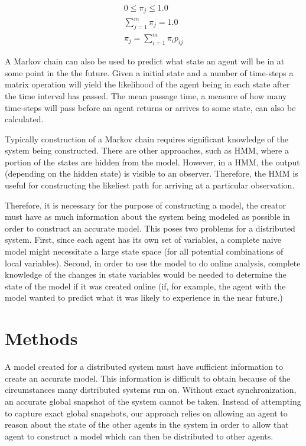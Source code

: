 \begin{align}
0\leq\pi_j\leq1.0 \\
\sum_{j = 1}^{m}\pi_j = 1.0 \\
\pi_j = \sum_{i=1}^{m} \pi_i p_{ij}
\end{align}

A Markov chain can also be used to predict what state an agent will be in at some point in the the future.
Given a initial state and a number of time-steps a matrix operation will yield the likelihood of the agent being in each state after the time interval has passed.
The mean passage time, a measure of how many time-steps will pass before an agent returns or arrives to some state, can also be calculated.

Typically construction of a Markov chain requires significant knowledge of the system being constructed. There are other approaches, such as \ac{HMM}, where a portion of the states are hidden from the model. However, in a \ac{HMM}, the output (depending on the hidden state) is visible to an observer. Therefore, the \ac{HMM} is useful for constructing the likeliest path for arriving at a particular observation.

Therefore, it is necessary for the purpose of constructing a model, the creator must have as much information about the system being modeled as possible in order to construct an accurate model. This poses two problems for a distributed system. First, since each agent has its own set of variables, a complete naive model might necessitate a large state space (for all potential combinations of local variables). Second, in order to use the model to do online analysis, complete knowledge of the changes in state variables would be needed to determine the state of the model if it was created online (if, for example, the agent with the model wanted to predict what it was likely to experience in the near future.)


\section{Methods}

A model created for a distributed system must have sufficient information to create an accurate model. This information is difficult to obtain because of the circumstances many distributed systems run on. Without exact synchronization, an accurate global snapshot of the system cannot be taken. Instead of attempting to capture exact global snapshots, our approach relies on allowing an agent to reason about the state of the other agents in the system in order to allow that agent to construct a model which can then be distributed to other agents.

